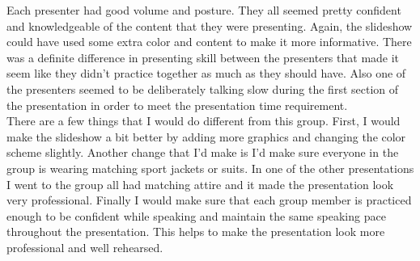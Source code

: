 \documentclass[12pt]{article}
\begin{document}
Each presenter had good volume and posture. They all seemed pretty confident and knowledgeable of the content that they were presenting. Again, the slideshow could have used some extra color and content to make it more informative. There was a definite difference in presenting skill between the presenters that made it seem like they didn't practice together as much as they should have. Also one of the presenters seemed to be deliberately talking slow during the first section of the presentation in order to meet the presentation time requirement.\\

There are a few things that I would do different from this group. First, I would make the slideshow a bit better by adding more graphics and changing the color scheme slightly. Another change that I'd make is I'd make sure everyone in the group is wearing matching sport jackets or suits. In one of the other presentations I went to the group all had matching attire and it made the presentation look very professional. Finally I would make sure that each group member is practiced enough to be confident while speaking and maintain the same speaking pace throughout the presentation. This helps to make the presentation look more professional and well rehearsed. 
\end{document}
